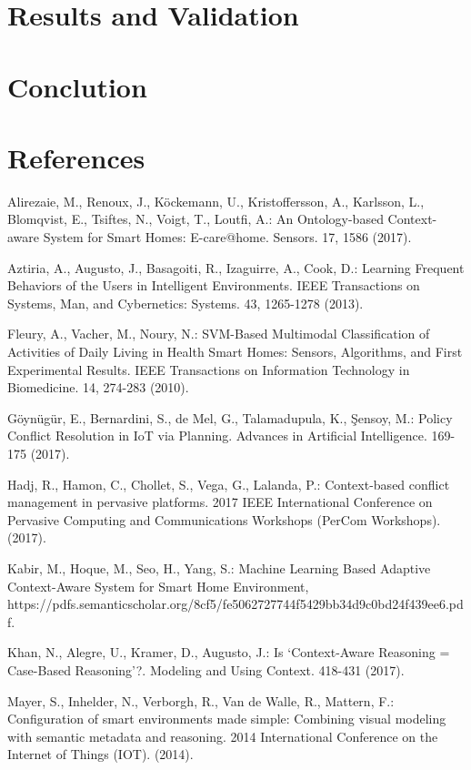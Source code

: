\documentclass{llncs}
\begin{document}
    \section{Results and Validation}
    \section{Conclution}
    \section{References}
    \begin{thebibliography}{1}
        Alirezaie, M., Renoux, J., Köckemann, U., Kristoffersson, A., Karlsson, L., Blomqvist, E., Tsiftes, N., Voigt, T., Loutfi, A.: An Ontology-based Context-aware System for Smart Homes: E-care@home. Sensors. 17, 1586 (2017).

        Aztiria, A., Augusto, J., Basagoiti, R., Izaguirre, A., Cook, D.: Learning Frequent Behaviors of the Users in Intelligent Environments. IEEE Transactions on Systems, Man, and Cybernetics: Systems. 43, 1265-1278 (2013).

        Fleury, A., Vacher, M., Noury, N.: SVM-Based Multimodal Classification of Activities of Daily Living in Health Smart Homes: Sensors, Algorithms, and First Experimental Results. IEEE Transactions on Information Technology in Biomedicine. 14, 274-283 (2010).

        Göynügür, E., Bernardini, S., de Mel, G., Talamadupula, K., Şensoy, M.: Policy Conflict Resolution in IoT via Planning. Advances in Artificial Intelligence. 169-175 (2017).

        Hadj, R., Hamon, C., Chollet, S., Vega, G., Lalanda, P.: Context-based conflict management in pervasive platforms. 2017 IEEE International Conference on Pervasive Computing and Communications Workshops (PerCom Workshops). (2017).

        Kabir, M., Hoque, M., Seo, H., Yang, S.: Machine Learning Based Adaptive Context-Aware System for Smart Home Environment, https://pdfs.semanticscholar.org/8cf5/fe5062727744f5429bb34d9c0bd24f439ee6.pdf.

        Khan, N., Alegre, U., Kramer, D., Augusto, J.: Is ‘Context-Aware Reasoning = Case-Based Reasoning’?. Modeling and Using Context. 418-431 (2017).

        Mayer, S., Inhelder, N., Verborgh, R., Van de Walle, R., Mattern, F.: Configuration of smart environments made simple: Combining visual modeling with semantic metadata and reasoning. 2014 International Conference on the Internet of Things (IOT). (2014).


\end{thebibliography}
\end{document}

